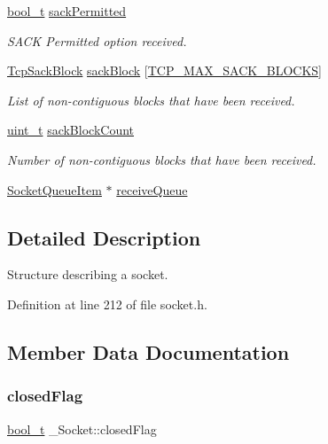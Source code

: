\begin{DoxyCompactItemize}
\hyperlink{compiler__port_8h_a812d16e5494522586b3784e55d479912}{bool\+\_\+t} \hyperlink{struct__Socket_a8ddd2cd0a0b59880a111d99659ef5dbf}{sack\+Permitted}
\begin{DoxyCompactList}\small\item\em S\+A\+CK Permitted option received. \end{DoxyCompactList}\item 
\hyperlink{structTcpSackBlock}{Tcp\+Sack\+Block} \hyperlink{struct__Socket_aee81c21cb2628d08f28e4a14563115fd}{sack\+Block} \mbox{[}\hyperlink{tcp_8h_a8d978686549f4d2aec3526cadf667dc1}{T\+C\+P\+\_\+\+M\+A\+X\+\_\+\+S\+A\+C\+K\+\_\+\+B\+L\+O\+C\+KS}\mbox{]}
\begin{DoxyCompactList}\small\item\em List of non-\/contiguous blocks that have been received. \end{DoxyCompactList}\item 
\hyperlink{compiler__port_8h_a12a1e9b3ce141648783a82445d02b58d}{uint\+\_\+t} \hyperlink{struct__Socket_a7a6ff6f130b9262146937812c536e89e}{sack\+Block\+Count}
\begin{DoxyCompactList}\small\item\em Number of non-\/contiguous blocks that have been received. \end{DoxyCompactList}\item 
\hyperlink{socket_8h_a3de9721a15d5f4c878df4e2dfccc078f}{Socket\+Queue\+Item} $\ast$ \hyperlink{struct__Socket_aa8f1661b715d180d8757600a4e9f6560}{receive\+Queue}
\end{DoxyCompactItemize}


\subsection{Detailed Description}
Structure describing a socket. 

Definition at line 212 of file socket.\+h.



\subsection{Member Data Documentation}
\mbox{\label{struct__Socket_a01b5dbbf4c0b0b771f42e6fed879b0e9}} 
\subsubsection{\texorpdfstring{closed\+Flag}{closedFlag}}
{\footnotesize\ttfamily \hyperlink{compiler__port_8h_a812d16e5494522586b3784e55d479912}{bool\+\_\+t} \+\_\+\+Socket\+::closed\+Flag}



